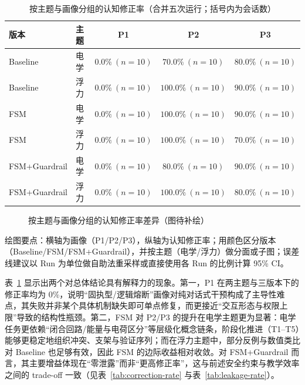 \begin{table}[htbp]
    \centering
    \caption{按主题与画像分组的认知修正率（合并五次运行；括号内为会话数）}
    \label{tab:grouped-correction-topic-profile}
    \begin{tabular}{llccc}
        \hline
        \textbf{版本} & \textbf{主题} & \textbf{P1} & \textbf{P2} & \textbf{P3} \\
        \hline
        Baseline & 电学 & $0.0\%~(n=10)$ & $70.0\%~(n=10)$ & $80.0\%~(n=10)$ \\
        Baseline & 浮力 & $0.0\%~(n=10)$ & $100.0\%~(n=10)$ & $90.0\%~(n=10)$ \\
        \hline
        FSM & 电学 & $0.0\%~(n=10)$ & $100.0\%~(n=10)$ & $90.0\%~(n=10)$ \\
        FSM & 浮力 & $0.0\%~(n=10)$ & $100.0\%~(n=10)$ & $70.0\%~(n=10)$ \\
        \hline
        FSM+Guardrail & 电学 & $0.0\%~(n=10)$ & $80.0\%~(n=10)$ & $90.0\%~(n=10)$ \\
        FSM+Guardrail & 浮力 & $0.0\%~(n=10)$ & $100.0\%~(n=10)$ & $80.0\%~(n=10)$ \\
        \hline
    \end{tabular}
\end{table}

\begin{figure}[htbp]
    \centering
    \caption{按主题与画像分组的认知修正率差异（图待补绘）}
    \label{fig:grouped-correction-topic-profile}
\end{figure}

绘图要点：横轴为画像（P1/P2/P3），纵轴为认知修正率；用颜色区分版本（Baseline/FSM/FSM+Guardrail），并按主题（电学/浮力）做分面或子图；误差线建议以 Run 为单位做自助法重采样或直接使用各 Run 的比例计算 95\% CI。

表~\ref{tab:grouped-correction-topic-profile} 显示出两个对总体结论具有解释力的现象。第一，P1 在两主题与三版本下的修正率均为 0\%，说明“固执型/逻辑熔断”画像对纯对话式干预构成了主导性难点，其失败并非某个具体机制缺失即可单点修复，而更接近“交互形态与权限上限”导致的结构性瓶颈。第二，FSM 对 P2/P3 的提升在电学主题更为显著：电学任务更依赖“闭合回路/能量与电荷区分”等层级化概念链条，阶段化推进（T1--T5）能够更稳定地组织冲突、支架与验证序列；而在浮力主题中，部分反例与数值类比对 Baseline 也足够有效，因此 FSM 的边际收益相对收敛。对 FSM+Guardrail 而言，其主要增益体现在“零泄露”而非“更高修正率”，这与前述安全约束与教学效率之间的 trade-off 一致（见表~\ref{tab:correction-rate} 与表~\ref{tab:leakage-rate}）。

